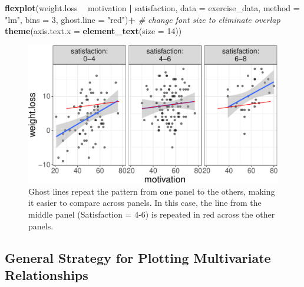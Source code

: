 \documentclass[
  doc]{apa6}
\newenvironment{Shaded}{\begin{snugshade}}{\end{snugshade}}
\newcommand{\CommentTok}[1]{\textcolor[rgb]{0.56,0.35,0.01}{\textit{#1}}}
\newcommand{\DataTypeTok}[1]{\textcolor[rgb]{0.13,0.29,0.53}{#1}}
\newcommand{\DecValTok}[1]{\textcolor[rgb]{0.00,0.00,0.81}{#1}}
\newcommand{\KeywordTok}[1]{\textcolor[rgb]{0.13,0.29,0.53}{\textbf{#1}}}
\newcommand{\NormalTok}[1]{#1}
\newcommand{\OperatorTok}[1]{\textcolor[rgb]{0.81,0.36,0.00}{\textbf{#1}}}
\newcommand{\StringTok}[1]{\textcolor[rgb]{0.31,0.60,0.02}{#1}}
\begin{document}
\begin{Shaded}
\begin{Highlighting}[]
\KeywordTok{flexplot}\NormalTok{(weight.loss }\OperatorTok{~}\StringTok{ }\NormalTok{motivation }\OperatorTok{|}\StringTok{ }\NormalTok{satisfaction, }
             \DataTypeTok{data =}\NormalTok{ exercise_data, }\DataTypeTok{method =} \StringTok{"lm"}\NormalTok{, }
             \DataTypeTok{bins =} \DecValTok{3}\NormalTok{, }\DataTypeTok{ghost.line =} \StringTok{"red"}\NormalTok{)}\OperatorTok{+}
\StringTok{  }\CommentTok{# change font size to eliminate overlap}
\StringTok{    }\KeywordTok{theme}\NormalTok{(}\DataTypeTok{axis.text.x =} 
            \KeywordTok{element_text}\NormalTok{(}\DataTypeTok{size =} \DecValTok{14}\NormalTok{))}
\end{Highlighting}
\end{Shaded}

\begin{figure}

{\centering \includegraphics[width=0.8\linewidth]{flexplot_psychmeth_files/figure-latex/ghost-1} 

}

\caption{Ghost lines repeat the pattern from one panel to the others, making it easier to compare across panels. In this case, the line from the middle panel (Satisfaction = 4-6) is repeated in red across the other panels. \label{fig:ghost}}\label{fig:ghost}
\end{figure}

\hypertarget{general-strategy-for-plotting-multivariate-relationships}{%
\subsection{General Strategy for Plotting Multivariate Relationships}\label{general-strategy-for-plotting-multivariate-relationships}}
\end{document}
